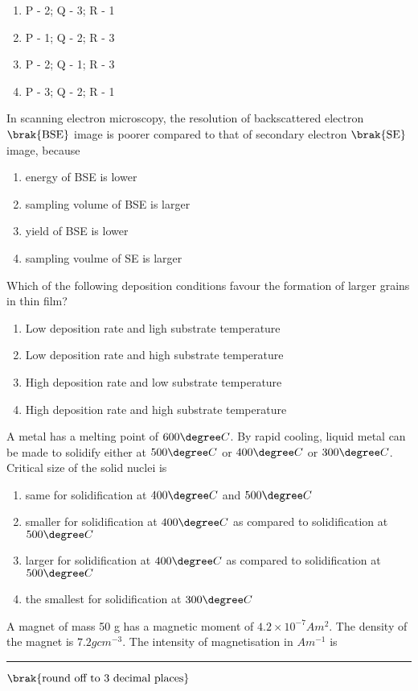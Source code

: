 		\begin{enumerate}                                                            
                        \item P - 2; Q - 3; R - 1
                        \item P - 1; Q - 2; R - 3                        
                        \item P - 2; Q - 1; R - 3
                        \item P - 3; Q - 2; R - 1
                \end{enumerate}
	\item In scanning electron microscopy, the resolution of backscattered electron $\brak{\text{BSE}}$ image is poorer compared to that of secondary electron $\brak{\text{SE}}$ image, because
		\begin{enumerate}                                                            
                        \item energy of BSE is lower
                        \item sampling volume of BSE is larger                     
                        \item yield of BSE is lower
                        \item sampling voulme of SE is larger
                \end{enumerate}
	\item Which of the following deposition conditions favour the formation of larger grains in thin film?
		\begin{enumerate}                                                               
                        \item Low deposition rate and ligh substrate temperature
                        \item Low deposition rate and high substrate temperature
                        \item High deposition rate and low substrate temperature
                        \item High deposition rate and high substrate temperature
                \end{enumerate}
	\item A metal has a melting point of $600\degree C$. By rapid cooling, liquid metal can be made to solidify either at $500\degree C$ or $400\degree C$ or $300\degree C$. Critical size of the solid nuclei is
		\begin{enumerate}                                                               
                        \item same for solidification at $400\degree C$ and $500\degree C$
			\item smaller for solidification at $400\degree C$ as compared to solidification at $500\degree C$
                        \item larger for solidification at $400\degree C$ as compared to solidification at $500\degree C$
                        \item the smallest for solidification at $300\degree C$
                \end{enumerate}
	\item A magnet of mass 50 g has a magnetic moment of $4.2 \times 10^{-7} A m^2$. The density of the magnet is $7.2 g cm^{-3}$. The intensity of magnetisation in $A m^{-1}$ is \rule{1cm}{0.4pt} $\brak{\text{round off to 3 decimal places}}$
